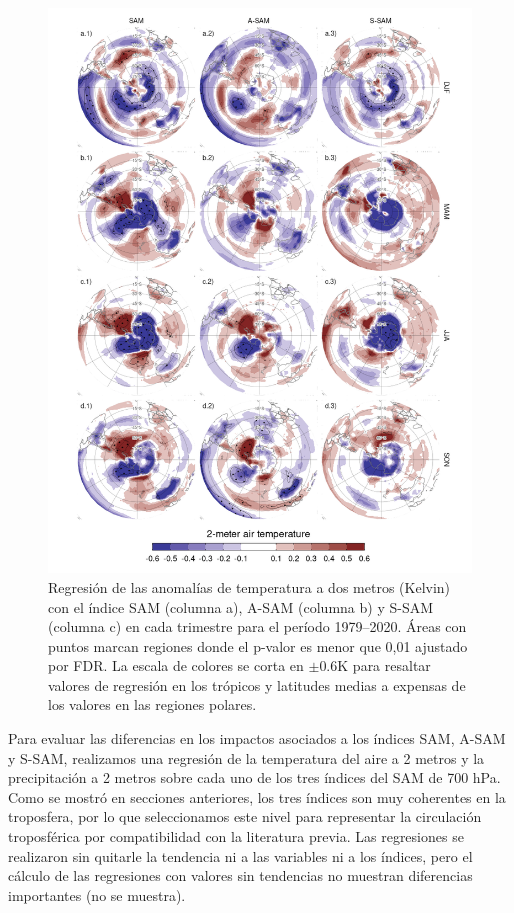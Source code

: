 \documentclass[12pt,oneside,a4paper]{reedthesis}
\begin{document}
\begin{figure}

{\centering \includegraphics{figures/30-sam/regr-air-season-1} 

}

\caption{Regresión de las anomalías de temperatura a dos metros (Kelvin) con el índice SAM (columna a), A-SAM (columna b) y S-SAM (columna c) en cada trimestre para el período 1979--2020. Áreas con puntos marcan regiones donde el p-valor es menor que 0,01 ajustado por FDR. La escala de colores se corta en \(\pm0.6 \mathrm{K}\) para resaltar valores de regresión en los trópicos y latitudes medias a expensas de los valores en las regiones polares.}\label{fig:regr-air-season}
\end{figure}

Para evaluar las diferencias en los impactos asociados a los índices SAM, A-SAM y S-SAM, realizamos una regresión de la temperatura del aire a 2 metros y la precipitación a 2 metros sobre cada uno de los tres índices del SAM de 700 hPa.
Como se mostró en secciones anteriores, los tres índices son muy coherentes en la troposfera, por lo que seleccionamos este nivel para representar la circulación troposférica por compatibilidad con la literatura previa.
Las regresiones se realizaron sin quitarle la tendencia ni a las variables ni a los índices, pero el cálculo de las regresiones con valores sin tendencias no muestran diferencias importantes (no se muestra).
\end{document}

